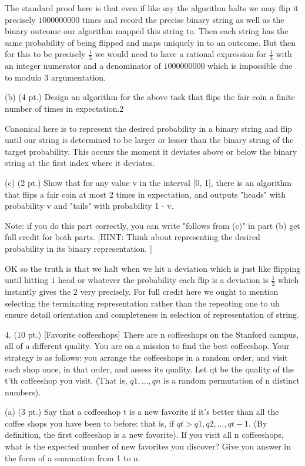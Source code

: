 The standard proof here is that even if like say the algorithm halts we may flip it precisely $1000000000$ times and record the precise binary string as well as the binary outcome our algorithm mapped this string to. Then each string has the same probability of being flipped and maps uniquely in to an outcome. But then for this to be precisely $\frac{1}{3}$ we would need to have a rational expression for $\frac{1}{3}$ with an integer numerator and a denominator of $1000000000$ which is impossible due to modulo $3$ argumentation.

(b) (4 pt.) Design an algorithm for the above task that flips the fair coin a finite number
of times in expectation.2

Canonical here is to represent the desired probability in a binary string and flip until our string is determined to be larger or lesser than the binary string of the target probability. This occurs the moment it deviates above or below the binary string at the first index where it deviates.

(c) (2 pt.) Show that for any value v in the interval [0, 1], there is an algorithm that flips a fair coin at most 2 times in expectation, and outputs "heads" with probability v and "tails" with probability 1 - v.

Note: if you do this part correctly, you can write "follows from (c)" in part (b) get full credit for both parts. [HINT: Think about representing the desired probability in its binary representation. ]

OK so the truth is that we halt when we hit a deviation which is just like flipping until hitting $1$ head or whatever the probability each flip is a deviation is $\frac{1}{2}$ which instantly gives the $2$ very precisely. For full credit here we ought to mention selecting the terminating representation rather than the repeating one to uh ensure detail orientation and completeness in selection of representation of string.

4. (10 pt.) [Favorite coffeeshops] There are n coffeeshops on the Stanford campus, all of a different quality. You are on a mission to find the best coffeeshop. Your strategy is as follows: you arrange the coffeeshops in a random order, and visit each shop once, in that order, and assess its quality. Let qt be the quality of the t'th coffeeshop you visit. (That is, $q1, . . . , qn$ is a random permutation of n distinct numbers).

(a) (3 pt.) Say that a coffeeshop t is a new favorite if it's better than all the coffee shops you have been to before: that is, if $qt > q1, q2, . . . , qt-1$. (By definition, the first coffeeshop is a new favorite). If you visit all n coffeeshops, what is the expected number of new favorites you discover? Give you answer in the form of a summation from 1 to n.

